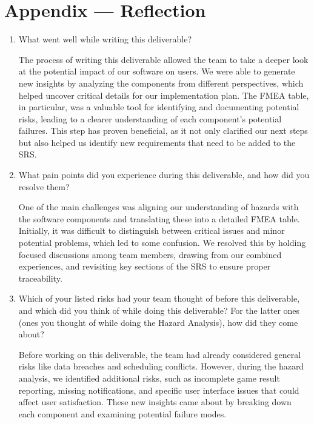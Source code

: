 \documentclass{article}
\begin{document}
\newpage{}

\section*{Appendix --- Reflection}



\begin{enumerate}
    \item What went well while writing this deliverable?

          The process of writing this deliverable allowed the team to take a deeper look at the potential impact of our software on users. We were able to generate new insights by analyzing the components from different perspectives, which helped uncover critical details for our implementation plan. The FMEA table, in particular, was a valuable tool for identifying and documenting potential risks, leading to a clearer understanding of each component's potential failures. This step has proven beneficial, as it not only clarified our next steps but also helped us identify new requirements that need to be added to the SRS.

    \item What pain points did you experience during this deliverable, and how
          did you resolve them?

          One of the main challenges was aligning our understanding of hazards with the software components and translating these into a detailed FMEA table. Initially, it was difficult to distinguish between critical issues and minor potential problems, which led to some confusion. We resolved this by holding focused discussions among team members, drawing from our combined experiences, and revisiting key sections of the SRS to ensure proper traceability.

    \item Which of your listed risks had your team thought of before this
          deliverable, and which did you think of while doing this deliverable? For
          the latter ones (ones you thought of while doing the Hazard Analysis), how
          did they come about?

          Before working on this deliverable, the team had already considered general risks like data breaches and scheduling conflicts. However, during the hazard analysis, we identified additional risks, such as incomplete game result reporting, missing notifications, and specific user interface issues that could affect user satisfaction. These new insights came about by breaking down each component and examining potential failure modes.


\end{enumerate}
\end{document}
